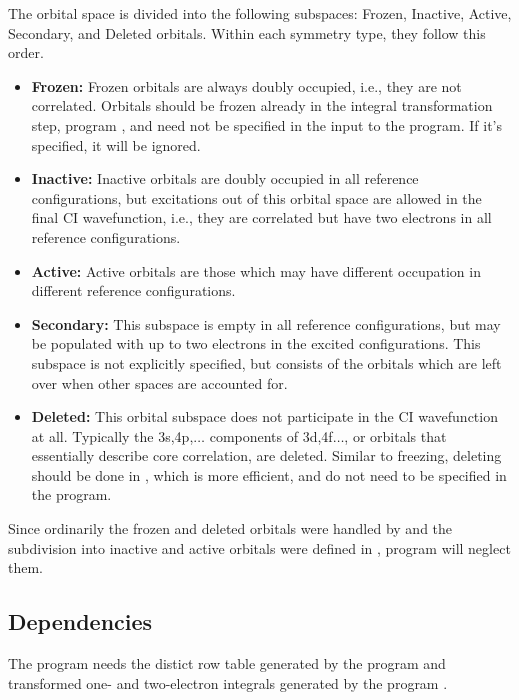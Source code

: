 The orbital space is divided into the following subspaces: Frozen,
Inactive, Active, Secondary, and Deleted orbitals. Within each
symmetry type, they follow this order.
\begin{itemize}
\itemsep 9pt plus 3pt minus 3pt
\item
{\bf Frozen:}
Frozen orbitals are always doubly
occupied, i.e., they are not correlated. Orbitals should be frozen
already in the integral transformation step, program
, and need not be specified in the input to the
 program. If it's specified, it will be ignored.
\item
{\bf Inactive:}
Inactive orbitals are doubly occupied
in all reference configurations, but excitations out of this orbital
space are allowed in the final CI wavefunction, i.e., they are
correlated but have two electrons in all reference configurations.
\item
{\bf Active:}
Active orbitals are those which may have
different occupation in different reference configurations.
\item
{\bf Secondary:}
This subspace is empty in all
reference configurations, but may be populated with up to two
electrons in the excited configurations. This subspace is not
explicitly specified, but consists of the orbitals which are left over
when other spaces are accounted for.
\item
{\bf Deleted:}
This orbital subspace does not
participate in the CI wavefunction at all. Typically the 3s,4p,$\ldots$
components of 3d,4f$\ldots$, or orbitals that essentially describe core
correlation, are deleted. Similar to freezing, deleting should be done in
,
which is more efficient, and do not need to be specified in the
 program.
\end{itemize}

Since ordinarily the frozen and deleted orbitals were handled by
and the subdivision into inactive and
active orbitals were defined in
, program  will neglect them.

\subsection{Dependencies}
\label{UG:sec:gugaci_dependencies}
The program needs the distict row table generated by the program
 and transformed one- and two-electron integrals
generated by the program
.

